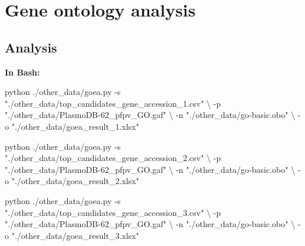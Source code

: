 \documentclass[
  11pt,
  oneside]{book}
\newenvironment{Shaded}{\begin{snugshade}}{\end{snugshade}}
\newcommand{\AttributeTok}[1]{\textcolor[rgb]{0.77,0.63,0.00}{#1}}
\newcommand{\DataTypeTok}[1]{\textcolor[rgb]{0.13,0.29,0.53}{#1}}
\newcommand{\ExtensionTok}[1]{#1}
\newcommand{\NormalTok}[1]{#1}
\newcommand{\StringTok}[1]{\textcolor[rgb]{0.31,0.60,0.02}{#1}}
\begin{document}
\hypertarget{gene-ontology-analysis}{%
\section{Gene ontology analysis}\label{gene-ontology-analysis}}

\hypertarget{analysis-9}{%
\subsection{Analysis}\label{analysis-9}}

\textbf{In Bash: }

\begin{Shaded}
\begin{Highlighting}[]
\ExtensionTok{python}\NormalTok{ ./other\_data/goea.py }\AttributeTok{{-}s} \StringTok{"./other\_data/top\_candidates\_gene\_accession\_1.csv"} \DataTypeTok{\textbackslash{}}
                            \AttributeTok{{-}p} \StringTok{"./other\_data/PlasmoDB{-}62\_pfpv\_GO.gaf"} \DataTypeTok{\textbackslash{}}
                            \AttributeTok{{-}n} \StringTok{"./other\_data/go{-}basic.obo"} \DataTypeTok{\textbackslash{}}
                            \AttributeTok{{-}o} \StringTok{"./other\_data/goea\_result\_1.xlsx"}
                            
\ExtensionTok{python}\NormalTok{ ./other\_data/goea.py }\AttributeTok{{-}s} \StringTok{"./other\_data/top\_candidates\_gene\_accession\_2.csv"} \DataTypeTok{\textbackslash{}}
                            \AttributeTok{{-}p} \StringTok{"./other\_data/PlasmoDB{-}62\_pfpv\_GO.gaf"} \DataTypeTok{\textbackslash{}}
                            \AttributeTok{{-}n} \StringTok{"./other\_data/go{-}basic.obo"} \DataTypeTok{\textbackslash{}}
                            \AttributeTok{{-}o} \StringTok{"./other\_data/goea\_result\_2.xlsx"}
                            
\ExtensionTok{python}\NormalTok{ ./other\_data/goea.py }\AttributeTok{{-}s} \StringTok{"./other\_data/top\_candidates\_gene\_accession\_3.csv"} \DataTypeTok{\textbackslash{}}
                            \AttributeTok{{-}p} \StringTok{"./other\_data/PlasmoDB{-}62\_pfpv\_GO.gaf"} \DataTypeTok{\textbackslash{}}
                            \AttributeTok{{-}n} \StringTok{"./other\_data/go{-}basic.obo"} \DataTypeTok{\textbackslash{}}
                            \AttributeTok{{-}o} \StringTok{"./other\_data/goea\_result\_3.xlsx"}
\end{Highlighting}
\end{Shaded}
\end{document}
